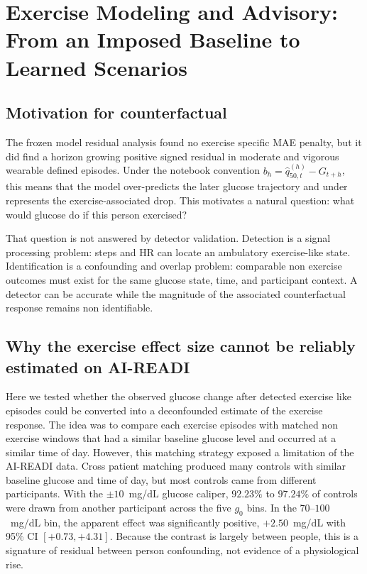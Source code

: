 
\section{Exercise Modeling and Advisory: From an Imposed Baseline to Learned Scenarios}
\label{sec:exercise_counterfactual}

\subsection{Motivation for counterfactual}
\label{subsec:ex_cf_question}

The frozen model residual analysis found no exercise specific MAE penalty, but it
did find a horizon growing positive signed residual in moderate and vigorous
wearable defined episodes. Under the notebook convention
$b_h=\hat q_{50,t}^{(h)}-G_{t+h}$, this means that the model over-predicts the
later glucose trajectory and under represents the exercise-associated drop.
This motivates a natural question: what would
glucose do if this person exercised?

That question is not answered by detector validation. Detection is a signal processing problem:
steps and HR can locate an ambulatory exercise-like state. Identification is
a confounding and overlap problem: comparable non exercise outcomes must exist
for the same glucose state, time, and participant context. A detector can be
accurate while the magnitude of the associated counterfactual response remains
non identifiable.

\subsection{Why the exercise effect size cannot be reliably estimated on AI-READI}
\label{subsec:ex_stage0}

Here we tested whether the observed glucose change after detected exercise like episodes could be converted into a deconfounded estimate of the exercise response. The idea was to compare each exercise episodes with matched non exercise windows that had a similar baseline glucose level and occurred at a similar time of day. However, this matching strategy exposed a limitation of the AI-READI data. Cross patient matching produced many controls with similar baseline glucose and time of day, but most controls came from different participants.
With the $\pm10$~mg/dL glucose caliper, $92.23\%$ to $97.24\%$ of controls were
drawn from another participant across the five $g_0$ bins. In the
$70$--$100$~mg/dL bin, the apparent effect was significantly positive,
$+2.50$~mg/dL with 95\% CI $[+0.73,+4.31]$. Because the contrast is largely
between people, this is a signature of residual between person confounding,
not evidence of a physiological rise.

